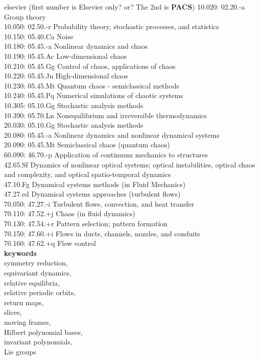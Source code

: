 						\noindent
elsevier (first number is Elsevier only? or? The 2nd is \textbf{PACS})
10.020: 02.20.-a Group theory	\\
10.050: 02.50.-r Probability theory, stochastic processes, and statistics 	\\
10.150: 05.40.Ca Noise	\\
10.180: 05.45.-a Nonlinear dynamics and chaos	\\
10.190: 05.45.Ac Low-dimensional chaos	\\
10.210: 05.45.Gg Control of chaos, applications of chaos	\\
10.220: 05.45.Jn High-dimensional chaos	\\
10.230: 05.45.Mt Quantum chaos - semiclassical methods	\\
10.240: 05.45.Pq Numerical simulations of chaotic systems	\\
10.305: 05.10.Gg Stochastic analysis methods	\\
10.390: 05.70.Ln Nonequilibrium and irreversible thermodynamics	\\
20.030: 05.10.Gg Stochastic analysis methods	\\
20.080: 05.45.-a Nonlinear dynamics and nonlinear dynamical systems	\\
20.090: 05.45.Mt Semiclassical chaos (quantum chaos)	\\
60.090: 46.70.-p Application of continuum mechanics to structures	\\
42.65.Sf Dynamics of nonlinear optical systems; optical instabilities,
         optical chaos and complexity, and optical spatio-temporal dynamics \\
47.10.Fg 	Dynamical systems methods (in Fluid Mechanics)	\\
47.27.ed 	Dynamical systems approaches (turbulent flows)	\\
70.050: 47.27.-i Turbulent flows, convection, and heat transfer	\\
70.110: 47.52.+j Chaos (in fluid dynamics)	\\
70.130: 47.54.+r Pattern selection; pattern formation	\\
70.150: 47.60.+i Flows in ducts, channels, nozzles, and conduits	\\
70.160: 47.62.+q Flow control	\\


						\noindent
\textbf{keywords}	\\
symmetry reduction,	\\
equivariant dynamics,	\\
relative equilibria,	\\
relative periodic orbits,	\\
return maps,	\\
slices,	\\
moving frames,	\\
Hilbert polynomial bases,	\\
invariant polynomials,	\\
Lie groups	\\


